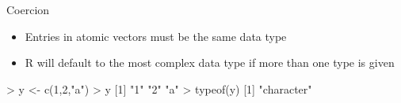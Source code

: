 \documentclass[
  ignorenonframetext,
]{beamer}
\newenvironment{Shaded}{\begin{snugshade}}{\end{snugshade}}
\newcommand{\DecValTok}[1]{\textcolor[rgb]{0.00,0.00,0.81}{#1}}
\newcommand{\FunctionTok}[1]{\textcolor[rgb]{0.00,0.00,0.00}{#1}}
\newcommand{\NormalTok}[1]{#1}
\newcommand{\OtherTok}[1]{\textcolor[rgb]{0.56,0.35,0.01}{#1}}
\newcommand{\SpecialCharTok}[1]{\textcolor[rgb]{0.00,0.00,0.00}{#1}}
\newcommand{\StringTok}[1]{\textcolor[rgb]{0.31,0.60,0.02}{#1}}
\providecommand{\tightlist}{%
  \setlength{\itemsep}{0pt}\setlength{\parskip}{0pt}}
\begin{document}
\begin{frame}[fragile]{Coercion}
\protect\hypertarget{coercion}{}
\begin{itemize}[<+->]
\tightlist
\item
  Entries in atomic vectors must be the same data type
\item
  R will default to the most complex data type if more than one type is
  given
\end{itemize}

\begin{Shaded}
\begin{Highlighting}[]
\SpecialCharTok{\textgreater{}}\NormalTok{ y }\OtherTok{\textless{}{-}} \FunctionTok{c}\NormalTok{(}\DecValTok{1}\NormalTok{,}\DecValTok{2}\NormalTok{,}\StringTok{"a"}\NormalTok{)}
\SpecialCharTok{\textgreater{}}\NormalTok{ y}
\NormalTok{[}\DecValTok{1}\NormalTok{] }\StringTok{"1"} \StringTok{"2"} \StringTok{"a"}
\SpecialCharTok{\textgreater{}} \FunctionTok{typeof}\NormalTok{(y)}
\NormalTok{[}\DecValTok{1}\NormalTok{] }\StringTok{"character"}
\end{Highlighting}
\end{Shaded}
\end{frame}
\end{document}
